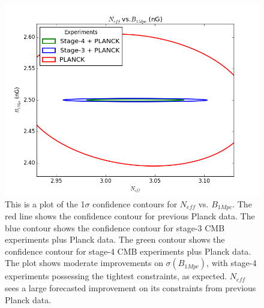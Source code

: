 \begin{figure}[h]
\centering
\includegraphics[scale=0.85]{images/contours/neff.png}
\caption{This is a plot of the 1$\sigma$ confidence contours for $N_{eff}$ vs. $B_{1Mpc}$. The red line shows the confidence contour for previous Planck data. The blue contour shows the confidence contour for stage-3 CMB experiments plus Planck data. The green contour shows the confidence contour for stage-4 CMB experiments plus Planck data. The plot shows moderate improvements on $\sigma(B_{1Mpc})$, with stage-4 experiments possessing the tightest constraints, as expected. $N_{eff}$ sees a large forecasted improvement on its constraints from previous Planck data. }
\label{fig:neff}
\end{figure}

